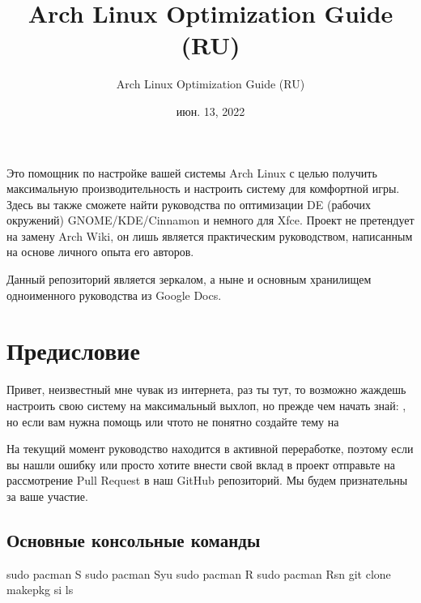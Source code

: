 \documentclass[letterpaper,10pt,russian,openany]{sphinxmanual}
\title{Arch Linux Optimization Guide (RU)}
\date{июн. 13, 2022}
\author{Arch Linux Optimization Guide (RU)}
\begin{document}
\pagestyle{empty}
\sphinxmaketitle
\pagestyle{plain}
\sphinxtableofcontents
\pagestyle{normal}
\label{\detokenize{index::doc}}


\sphinxAtStartPar
Это помощник по настройке вашей системы Arch Linux с целью получить максимальную производительность и настроить систему для комфортной игры.
Здесь вы также сможете найти руководства по оптимизации DE (рабочих окружений) GNOME/KDE/Cinnamon и немного для Xfce.
Проект не претендует на замену Arch Wiki, он лишь является практическим руководством, написанным на основе личного опыта его авторов.

\sphinxAtStartPar
Данный репозиторий является зеркалом, а ныне и основным хранилищем одноименного руководства из Google Docs.

\sphinxstepscope


\chapter{Предисловие}
\label{\detokenize{source/preface:preface}}\label{\detokenize{source/preface:id1}}\label{\detokenize{source/preface::doc}}
\sphinxAtStartPar
Привет, неизвестный мне чувак из интернета, раз ты тут,
то возможно жаждешь настроить свою систему на максимальный выхлоп, но прежде чем начать \sphinxhyphen{} знай:
,
но если вам нужна помощь или что\sphinxhyphen{}то не понятно  \sphinxhyphen{} создайте тему на 

\sphinxAtStartPar
На текущий момент руководство находится в активной переработке,
поэтому если вы нашли ошибку или просто хотите внести свой вклад в проект \sphinxhyphen{} отправьте на рассмотрение Pull Request в наш GitHub репозиторий.
Мы будем признательны за ваше участие.

\ignorespaces 

\section{Основные консольные команды}
\label{\detokenize{source/preface:basic-commands}}\label{\detokenize{source/preface:index-0}}\label{\detokenize{source/preface:id2}}
\begin{sphinxVerbatim}[commandchars=\\\{\}]
sudo pacman \PYGZhy{}S    
sudo pacman \PYGZhy{}Syu  
sudo pacman \PYGZhy{}R    
sudo pacman \PYGZhy{}Rsn  
git clone         
makepkg \PYGZhy{}si       
                
ls                
\end{sphinxVerbatim}
\end{document}
